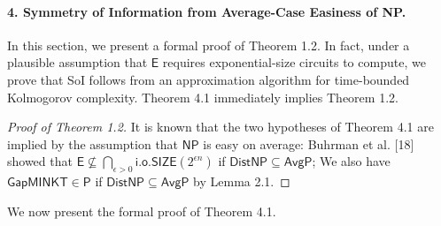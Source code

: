 \paragraph{4. Symmetry of Information from Average-Case Easiness of NP.}
In this section, we present a formal proof of Theorem 1.2. In fact, under a plausible assumption that $\mathsf E$ requires exponential-size circuits to compute, we prove that SoI follows from an approximation algorithm for time-bounded Kolmogorov complexity.
Theorem 4.1 immediately implies Theorem 1.2.
\begin{proof}[Proof of Theorem 1.2]
It is known that the two hypotheses of Theorem 4.1 are implied by the assumption that $\mathsf{NP}$ is easy on average: Buhrman et al. [18] showed that $\mathsf E\not\subseteq\bigcap_{\epsilon>0}\mathsf{i.o.SIZE}(2^{\epsilon n})$ if $\mathsf{DistNP}\subseteq\mathsf{AvgP}$; We also have $\mathsf{GapMINKT}\in\mathsf P$ if $\mathsf{DistNP}\subseteq\mathsf{AvgP}$ by Lemma 2.1.
\end{proof}
We now present the formal proof of Theorem 4.1.
